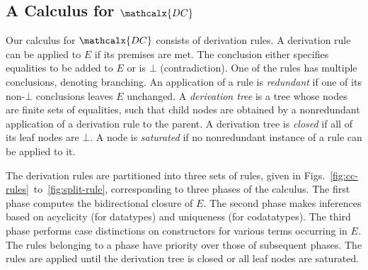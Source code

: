 \documentclass[smallcondensed,draft]{svjour3}
\newcommand\Sig{\mathrm{\Sigma}}
\newcommand\const[1]{\textsf{#1}}
\renewcommand{\vec}[1]{\bar #1}
\newcommand{\Ec}{E}
\newcommand{\tEc}{\Terms(\Ec)}
\newcommand{\thD}{\mathcalx{DC}}
\newcommand\Terms{\mathcalx{T}}
\newcommand\negvthinspace{\kern-0.083333em}
\begin{document}
\subsection{A Calculus for $\thD$}
\label{sec:calculus-for-dc}



Our calculus for $\thD$ consists of derivation rules.
A derivation rule can be applied to $\Ec$ if %
its premises are met.
The conclusion either specifies equalities to be added to $\Ec$
or is $\bot$ (contradiction).
One of the rules has multiple conclusions, %
denoting branching.
%
An application of a rule is \emph{redundant} if one of its non-$\bot$
conclusions leaves $\Ec$ unchanged.
A \emph{derivation tree} is a %
tree whose nodes are finite sets of
equalities, such that child nodes are obtained by a nonredundant application of a
derivation rule to the parent. A derivation tree is \emph{closed} if all of
its leaf nodes are $\bot$. A node is \emph{saturated} if no nonredundant
instance of a rule can be applied to it.

The derivation rules are partitioned into three sets of rules, given in
Figs.\ \ref{fig:cc-rules}~to~\ref{fig:split-rule}, corresponding to three
phases of the calculus. The first phase computes the bidirectional closure of $\Ec$. The second
phase makes inferences based on acyclicity (for datatypes) and uniqueness
(for codatatypes).
The third phase performs case distinctions on constructors for
various terms occurring in $\Ec$.
%
The rules belonging to a phase have priority over those of %
subsequent
phases. The rules are applied until the derivation tree is closed or all leaf nodes
are saturated.

\end{document}
